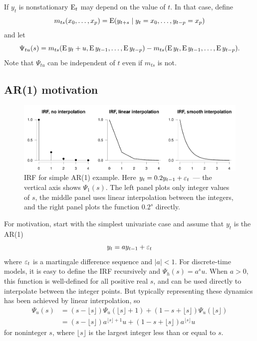 \documentclass[12pt,fleqn]{article}
\begin{document}
If $y_t$ is nonstationary $\operatorname{E}_t$ may depend on the value of $t$. In that
case, define
\begin{equation*}
  m_{ts}(x_0,\dots,x_p)
  = \operatorname{E}(y_{t+s} \mid y_t = x_0,\dots, y_{t-p} = x_p)
\end{equation*}
and let
\begin{equation*}
  \Psi_{tu}(s) =
  m_{ts}(\operatorname{E} y_t + u, \operatorname{E} y_{t-1}, \dots, \operatorname{E} y_{t-p}) - m_{ts}(\operatorname{E} y_t, \operatorname{E} y_{t-1}, \dots,\operatorname{E} y_{t-p}).
\end{equation*}
Note that $\Psi_{tu}$ can be independent of $t$ even if $m_{ts}$ is
not.

\subsection{AR(1) motivation}
\label{S2.1}

\begin{figure}[t]
  \centering
  \includegraphics{graphs/motivation.pdf}
  \caption{IRF for simple AR(1) example. Here $y_t = 0.2 y_{t-1} +
    \varepsilon_t$ --- the vertical axis shows $\Psi_1(s)$. The left panel
    plots only integer values of $s$, the middle panel uses linear
    interpolation between the integers, and the right panel plots the
    function $0.2^s$ directly.}
  \label{fig:1}
\end{figure}

For motivation, start with the simplest univariate case and assume
that $y_t$ is the AR(1)
\begin{equation}
  \label{eq:1}
  y_t = a y_{t-1} + \varepsilon_t
\end{equation}
where $\varepsilon_t$ is a martingale difference sequence and
$\lvert a \rvert < 1$.  For discrete-time models, it is easy to define
the IRF recursively and $\Psi_h(s) = a^s u$. When $a > 0$, this
function is well-defined for all positive real $s$, and can be used
directly to interpolate between the integer points. But typically
representing these dynamics has been achieved by linear interpolation,
so
\begin{align}
  \label{eq:2}
  \Psi_u(s)
  &= (s - \lfloor s\rfloor) \Psi_u(\lfloor s\rfloor+1)
    + (1 - s + \lfloor s\rfloor) \Psi_u(\lfloor s\rfloor) \\
  \label{eq:3}
  &= (s - \lfloor s\rfloor) a^{\lfloor s \rfloor + 1} u
    + (1 - s + \lfloor s\rfloor) a^{\lfloor s \rfloor} u
\end{align}
for noninteger $s$, where $\lfloor s\rfloor$ is the largest integer
less than or equal to $s$.
\end{document}

